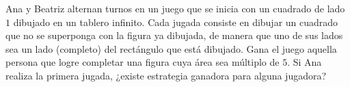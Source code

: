 Ana y Beatriz alternan turnos en un juego que se inicia con un cuadrado de lado $1$ dibujado en un tablero infinito. Cada jugada consiste en dibujar un cuadrado que no se superponga con la figura ya dibujada, de manera que uno de sus lados sea un lado (completo) del rectángulo que está dibujado. Gana el juego aquella persona que logre completar una figura cuya área sea múltiplo de $5$. Si Ana realiza la primera jugada, ¿existe estrategia ganadora para alguna jugadora?
